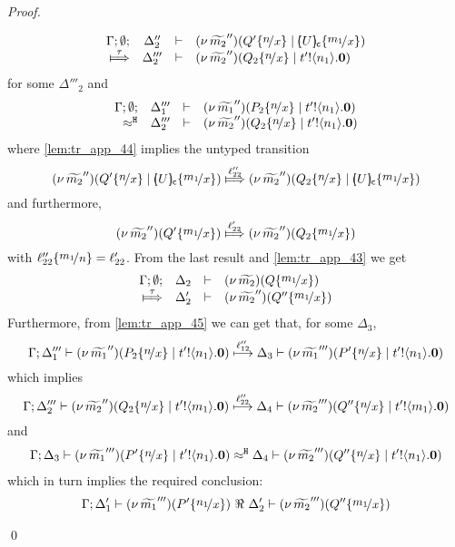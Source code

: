\begin{proof}
\begin{enumerate}[1.]
\begin{itemize}
\begin{itemize}
\begin{eqnarray}
											\mhorel{\Gamma}{\Delta_2''}{\newsp{\widetilde{m_2}''}{Q' \subst{n}{x} \Par \omapchar{U} \subst{m_1}{x}}}
											{\Hby{\tau}}
											{\Delta_2'''}{}{\newsp{\widetilde{m_2}''}{Q_2 \subst{n}{x} \Par \bout{t'}{n_1} \inact}}
											\label{lem:tr_app_44}
										\end{eqnarray}
										for some $\Delta'''_2$
										and
										\begin{eqnarray}
											\mhorel{\Gamma}{\Delta_1'''}{\newsp{\widetilde{m_1}''}{P_2 \subst{n}{x} \Par \bout{t'}{n_1} \inact}}
											{\hwb}
											{\Delta_2'''}{}{\newsp{\widetilde{m_2}''}{Q_2 \subst{n}{x} \Par \bout{t'}{n_1} \inact}}
											\label{lem:tr_app_45}
										\end{eqnarray}
										where \eqref{lem:tr_app_44} implies the untyped transition
										\[
											\newsp{\widetilde{m_2}''}{Q' \subst{n}{x} \Par \omapchar{U} \subst{m_1}{x}}
											\Hby{ \ell_{22}'' }
											\newsp{\widetilde{m_2}''}{Q_2 \subst{n}{x} \Par \omapchar{U} \subst{m_1}{x}}
										\]
										and furthermore,
										\[
											\newsp{\widetilde{m_2}''}{Q' \subst{m_1}{x}}
											\Hby{ \ell_{22}' }
											\newsp{\widetilde{m_2}''}{Q_2 \subst{m_1}{x}}
										\]
										with $\ell_{22}'' \subst{m_1}{n} = \ell_{22}'$.
										From the last result and \eqref{lem:tr_app_43} we get
										\[
											\mhorel{\Gamma}{\Delta_2}{\newsp{\widetilde{m_2}}{ Q \subst{m_1}{x}   }  }
											{\Hby{\tau}}
											{\Delta_2'}{}{\newsp{\widetilde{m_2}''}{ Q'' \subst{m_1}{x}   }  }
										\]
										Furthermore, from \eqref{lem:tr_app_45} we can get that, for some $\Delta_3$,
										\[
											\horel{\Gamma}{\Delta_1'''}{\newsp{\widetilde{m_1}''}{P_2 \subst{n}{x} \Par \bout{t'}{n_1} \inact}}
											{\hby{\ell_{12}''}}
											{\Delta_3}{\newsp{\widetilde{m_1}'''}{P' \subst{n}{x} \Par \bout{t'}{n_1} \inact}}
										\]
										which implies
										\[
											\horel{\Gamma}{\Delta_2'''}{\newsp{\widetilde{m_2}''}{Q_2 \subst{n}{x} \Par \bout{t'}{m_1} \inact}}
											{\hby{\ell_{22}''}}
											{\Delta_4}{\newsp{\widetilde{m_2}'''}{Q'' \subst{n}{x} \Par \bout{t'}{m_1} \inact}}
										\]
										and
										\begin{eqnarray*}
											\horel{\Gamma}{\Delta_3}{\newsp{\widetilde{m_1}'''}{P' \subst{n}{x} \Par \bout{t'}{n_1} \inact}}
											{\hwb}
											{\Delta_4}{\newsp{\widetilde{m_2}'''}{Q'' \subst{n}{x} \Par \bout{t'}{n_1} \inact}}
										\end{eqnarray*}
										which in turn implies the required conclusion:
										\begin{eqnarray*}											\horel{\Gamma}{\Delta_1'}{\newsp{\widetilde{m_1}'''}{P' \subst{n_1}{x}}}
											{\ \Re\ }
											{\Delta_2'}{\newsp{\widetilde{m_2}'''}{Q'' \subst{m_1}{x}}}
										\end{eqnarray*}
							\end{itemize}
					\end{itemize}
	\end{enumerate}
	\qed
\end{proof}


